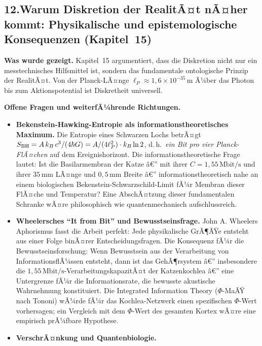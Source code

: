 ﻿\documentclass[12pt,a4paper,titlepage]{report}
\begin{document}
\subsection*{12.\enspace Warum Diskretion der RealitÃ¤t nÃ¤her kommt:
Physikalische und epistemologische Konsequenzen (Kapitel~15)}

\textbf{Was wurde gezeigt.}
Kapitel~15 argumentiert, dass die Diskretion nicht nur
ein messtech\-nisches Hilfsmittel ist, sondern das fundamentale
ontologische Prinzip der RealitÃ¤t.
Von der Planck-LÃ¤nge $\ell_P \approx 1{,}6\times10^{-35}\,\mathrm{m}$
Ã¼ber das Photon bis zum Aktionspotential ist Diskretheit
universell.

\textbf{Offene Fragen und weiterfÃ¼hrende Richtungen.}
\begin{itemize}[leftmargin=2em]
  \item \textbf{Bekenstein-Hawking-Entropie als informationstheoretisches Maximum.}
    Die Entropie eines Schwarzen Lochs betrÃ¤gt
    $S_{\rm BH} = A\,k_B\,c^3/(4\hbar G) = A/(4\ell_P^2) \cdot k_B\ln2$,
    d.\,h.\ \emph{ein Bit pro vier Planck-FlÃ¤chen} auf dem Ereignishorizont.
    Die informationstheoretische Frage lautet:
    Ist die Basilarmembran der Katze â€”
    mit ihrer $C = 1{,}55\,\mathrm{Mbit/s}$ und ihrer
    $35\,\mathrm{mm}$ LÃ¤nge und $0{,}5\,\mathrm{mm}$ Breite â€”
    informationstheoretisch nahe an einem biologischen
    Bekenstein-Schwarzschild-Limit fÃ¼r Membran dieser FlÃ¤che und Temperatur?
    Eine AbschÃ¤tzung dieser fundamentalen Schranke wÃ¤re
    philosophisch wie quantenmechanisch aufschlussreich.
  \item \textbf{Wheelersches ``It from Bit'' und Bewusstseinsfrage.}
    John A. Wheelers Aphorismus fasst die Arbeit perfekt:
    Jede physikalische GrÃ¶ÃŸe entsteht aus einer Folge binÃ¤rer
    Entscheidungsfragen.
    Die Konsequenz fÃ¼r die Bewusstseinsforschung:
    Wenn Bewusstsein aus der Verarbeitung von InformationsflÃ¼ssen
    entsteht, dann ist das GehÃ¶rsystem â€” insbesondere die
    $1{,}55\,\mathrm{Mbit/s}$-VerarbeitungskapazitÃ¤t
    der Katzenkochlea â€” eine Untergrenze fÃ¼r die
    Informationsrate, die bewusste akustische Wahrnehmung konstituiert.
    Die Integrated Information Theory ($\Phi$-MaÃŸ nach Tononi)
    wÃ¼rde fÃ¼r das Kochlea-Netzwerk einen
    spezifischen $\Phi$-Wert vorhersagen;
    ein Vergleich mit dem $\Phi$-Wert des gesamten Kortex
    wÃ¤re eine empirisch prÃ¼fbare Hypothese.
  \item \textbf{VerschrÃ¤nkung und Quantenbiologie.}

\end{itemize}
\end{document}
